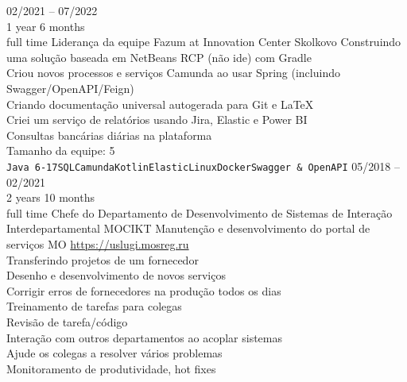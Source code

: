 


\begin{entrylist}
    \entry
    {02/2021 -- 07/2022\\\footnotesize{1 year 6 months\\full time}}
    {Liderança da equipe}
    {Fazum at Innovation Center Skolkovo}
    {
        Construindo uma solução baseada em NetBeans RCP (não ide) com Gradle \\
    Criou novos processos e serviços Camunda ao usar Spring (incluindo Swagger/OpenAPI/Feign) \\
    Criando documentação universal autogerada para Git e LaTeX \\
    Criei um serviço de relatórios usando Jira, Elastic e Power BI \\
    Consultas bancárias diárias na plataforma \\
    Tamanho da equipe: 5 \\
    \texttt{Java 6-17}\slashsep\texttt{SQL}\slashsep\texttt{Camunda}\slashsep\texttt{Kotlin}\slashsep\texttt{Elastic}\slashsep\texttt{Linux}\slashsep\texttt{Docker}\slashsep\texttt{Swagger \& OpenAPI}
    }
    \entry
    {05/2018 -- 02/2021\\\footnotesize{2 years 10 months\\full time}}
    {Chefe do Departamento de Desenvolvimento de Sistemas de Interação Interdepartamental}
    {MOCIKT}
    {
        Manutenção e desenvolvimento do portal de serviços MO \url{https://uslugi.mosreg.ru} \\
        Transferindo projetos de um fornecedor \\
        Desenho e desenvolvimento de novos serviços \\
        Corrigir erros de fornecedores na produção todos os dias \\
        Treinamento de tarefas para colegas \\
        Revisão de tarefa/código \\
        Interação com outros departamentos ao acoplar sistemas \\
        Ajude os colegas a resolver vários problemas \\
        Monitoramento de produtividade, hot fixes \\
}
\end{entrylist}
